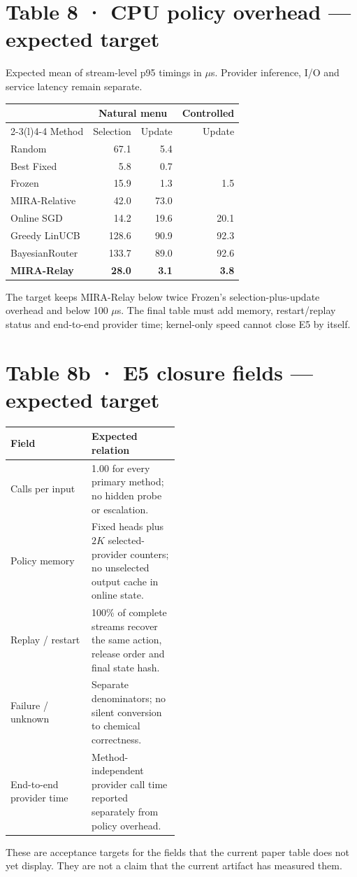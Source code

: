 \documentclass[10pt]{article}
\newcommand{\notrun}{\textemdash}
\newcommand{\targetcell}[1]{\textbf{#1}}
\newcommand{\smallnote}[1]{{\footnotesize\color{Gray}#1}}
\begin{document}
\section*{Table 8 · CPU policy overhead — expected target}
\smallnote{Expected mean of stream-level p95 timings in $\mu$s. Provider inference, I/O and service latency remain separate.}
\begin{tabularx}{\linewidth}{@{}lrrr@{}}
\toprule
& \multicolumn{2}{c}{Natural menu} & Controlled \\
\cmidrule(lr){2-3}\cmidrule(l){4-4}
Method & Selection & Update & Update \\
\midrule
Random & 67.1 & 5.4 & \notrun \\
Best Fixed & 5.8 & 0.7 & \notrun \\
Frozen & 15.9 & 1.3 & 1.5 \\
MIRA-Relative & 42.0 & 73.0 & \notrun \\
\midrule
Online SGD & 14.2 & 19.6 & 20.1 \\
Greedy LinUCB & 128.6 & 90.9 & 92.3 \\
BayesianRouter & 133.7 & 89.0 & 92.6 \\
\textbf{MIRA-Relay} & \targetcell{28.0} & \targetcell{3.1} & \targetcell{3.8} \\
\bottomrule
\end{tabularx}
\smallnote{The target keeps MIRA-Relay below twice Frozen's selection-plus-update overhead and below 100 $\mu$s. The final table must add memory, restart/replay status and end-to-end provider time; kernel-only speed cannot close E5 by itself.}

\section*{Table 8b · E5 closure fields — expected target}
\begin{tabularx}{\linewidth}{@{}p{0.48\linewidth}X@{}}
\toprule
Field & Expected relation \\
\midrule
Calls per input & 1.00 for every primary method; no hidden probe or escalation. \\
Policy memory & Fixed heads plus $2K$ selected-provider counters; no unselected output cache in online state. \\
Replay / restart & 100\% of complete streams recover the same action, release order and final state hash. \\
Failure / unknown & Separate denominators; no silent conversion to chemical correctness. \\
End-to-end provider time & Method-independent provider call time reported separately from policy overhead. \\
\bottomrule
\end{tabularx}
\smallnote{These are acceptance targets for the fields that the current paper table does not yet display. They are not a claim that the current artifact has measured them.}
\end{document}
